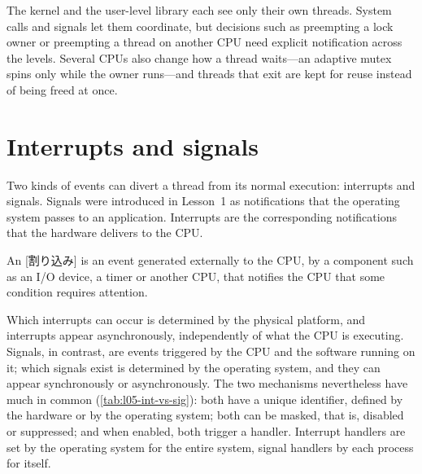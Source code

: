 \documentclass[../main.tex]{subfiles}
\begin{document}
\begin{keypoint}
  The kernel and the user-level library each see only their own threads.
  System calls and signals let them coordinate, but decisions such as
  preempting a lock owner or preempting a thread on another CPU need
  explicit notification across the levels.  Several CPUs also change how a
  thread waits---an adaptive mutex spins only while the owner runs---and
  threads that exit are kept for reuse instead of being freed at once.
\end{keypoint}

\section{Interrupts and signals}
\label{sec:l05-int-sig}

Two kinds of events can divert a thread from its normal execution:
interrupts and signals.  Signals were introduced in
Lesson~1 as notifications that the operating system passes to an
application.  Interrupts are the corresponding notifications that the
hardware delivers to the CPU.

\begin{definition}[Interrupt]
  An [割り込み] is an event generated externally to the
  CPU, by a component such as an I/O device, a timer or another CPU, that
  notifies the CPU that some condition requires attention.
\end{definition}

Which interrupts can occur is determined by the physical platform, and
interrupts appear asynchronously, independently of what the CPU is
executing.  Signals, in contrast, are events triggered by the
CPU and the software running on it; which signals exist is determined by
the operating system, and they can appear synchronously or asynchronously.
The two mechanisms nevertheless have much in common
(\cref{tab:l05-int-vs-sig}): both have a unique identifier, defined by the
hardware or by the operating system; both can be masked, that is, disabled
or suppressed; and when enabled, both trigger a handler.  Interrupt
handlers are set by the operating system for the entire system, signal
handlers by each process for itself.
\end{document}
